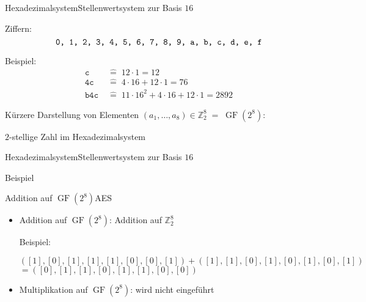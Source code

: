 \documentclass{beamer}
\newcommand{\Z}{\mathbb{Z}}
\newcommand{\GF}{\operatorname{GF}}
\newcommand{\ol}[1]{[#1]}
\theoremstyle{plain}
\begin{document}
\begin{frame}{Hexadezimalsystem}{Stellenwertsystem zur Basis $16$}

Ziffern:\\
 \[\text{\texttt{0, 1, 2, 3, 4, 5, 6, 7, 8, 9, a, b, c, d, e, f}}\]
 \bigskip
 
 Beispiel:
 \begin{align*}
 \texttt{c}\; & \widehat{=} \; 12 \cdot 1 = 12\\
 \texttt{4c}\; & \widehat{=} \; 4 \cdot 16 + 12 \cdot 1 = 76\\
  \texttt{b4c}\; & \widehat{=} \; 11 \cdot 16^2 + 4 \cdot 16 + 12 \cdot 1 = 2892
 \end{align*}
 \pause
 \begin{alertblock}{Kürzere Darstellung von Elementen $(a_1, \dotsc, a_8) \in \Z_2^8 \; \widehat{=} \; \GF(2^8)$:}
 \begin{center}
$2$-stellige Zahl im Hexadezimalsystem
\end{center}
\end{alertblock}
 \end{frame}

 \begin{frame}{Hexadezimalsystem}{Stellenwertsystem zur Basis $16$}
\begin{block}{Beispiel}
\begin{center}
  \end{center}
\end{block}
\end{frame}


\begin{frame}{Addition auf $\GF(2^8)$}{AES}
\begin{itemize}
\item  Addition auf $\GF(2^8)$: Addition auf $\Z_2^8$
\bigskip

Beispiel:
\begin{center}
 $(\ol 1, \ol 0, \ol 1, \ol 1, \ol 1, \ol 0, \ol 0, \ol 1) + (\ol 1, \ol 1, \ol 0, \ol 1, \ol 0, \ol 1, \ol 0, \ol 1)$
 $= (\ol 0, \ol 1, \ol 1, \ol 0, \ol 1, \ol 1, \ol 0, \ol 0)$
\end{center}
\medskip
\item Multiplikation auf $\GF(2^8)$: wird nicht eingeführt
\end{itemize}
\end{frame}
\end{document}
